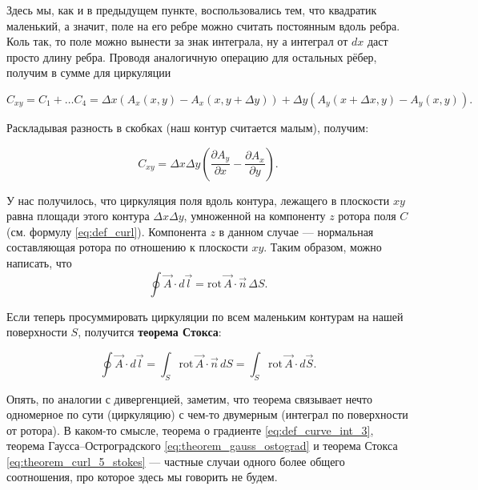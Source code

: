 \documentclass[12pt,a4paper]{article}
\numberwithin{equation}{section}
\numberwithin{equation}{section}
\newcommand{\pt}{\partial}
\newcommand{\rot}{\mathrm{rot}\,}
\begin{document}
Здесь мы, как и в предыдущем пункте, воспользовались тем, что
квадратик маленький, а значит, поле на его ребре можно считать
постоянным вдоль ребра. Коль так, то поле можно вынести за знак
интеграла, ну а интеграл от $dx$ даст просто длину ребра. Проводя
аналогичную операцию для остальных рёбер, получим в сумме для
циркуляции

\begin{equation}
  \label{eq:theorem_curl_2}
  C_{xy} = C_1 + \ldots C_4 = \Delta x
  \left(
    A_x (x,y) - A_x(x,y+\Delta y)
  \right) + \Delta y
  \left(
    A_y (x+\Delta x, y) - A_y (x,y)
  \right).
\end{equation}

Раскладывая разность в скобках (наш контур считается малым), получим:

\begin{equation}
  \label{eq:theorem_curl_3}
  C_{xy} = \Delta x \Delta y \left(\frac{\pt A_y}{\pt x} - \frac{\pt A_x}{\pt y}\right).
\end{equation}

У нас получилось, что циркуляция поля вдоль контура, лежащего в
плоскости $xy$ равна площади этого контура $\Delta x \Delta y$,
умноженной на компоненту $z$ ротора поля $C$ (см. формулу
\eqref{eq:def_curl}). Компонента $z$ в данном случае --- нормальная
составляющая ротора по отношению к плоскости $xy$. Таким образом,
можно написать, что
\begin{equation}
  \label{eq:theorem_curl_4}
  \oint \vec{A} \cdot d\vec{l} = \rot \vec{A} \cdot \vec{n}\, \Delta S.
\end{equation}

Если теперь просуммировать циркуляции по всем маленьким контурам на
нашей поверхности $S$, получится \textbf{теорема Стокса}:

\begin{equation}
  \label{eq:theorem_curl_5_stokes}
  \oint \vec{A} \cdot d \vec{l} = \int_S \rot \vec{A} \cdot \vec{n} \,
  dS = \int_S \rot \vec{A} \cdot d\vec{S}.
\end{equation}

Опять, по аналогии с дивергенцией, заметим, что теорема связывает
нечто одномерное по сути (циркуляцию) с чем-то двумерным (интеграл по
поверхности от ротора). В каком-то смысле, теорема о градиенте
\eqref{eq:def_curve_int_3}, теорема Гаусса--Остроградского
\eqref{eq:theorem_gauss_ostograd} и теорема Стокса
\eqref{eq:theorem_curl_5_stokes} --- частные случаи одного более
общего соотношения, про которое здесь мы говорить не будем. 
\end{document}
